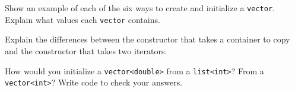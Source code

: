 %
%
\begin{question}
Show an example of each of the six ways to create and
initialize a \verb|vector|. Explain what values each \verb|vector| contains.
\end{question}

\begin{question}
 Explain the differences between the constructor that takes a
container to copy and the constructor that takes two iterators.
\end{question}

\begin{question}
How would you initialize a \verb|vector<double>| from a
\verb|list<int>|? From a \verb|vector<int>|? Write code to check your answers.
\end{question}
